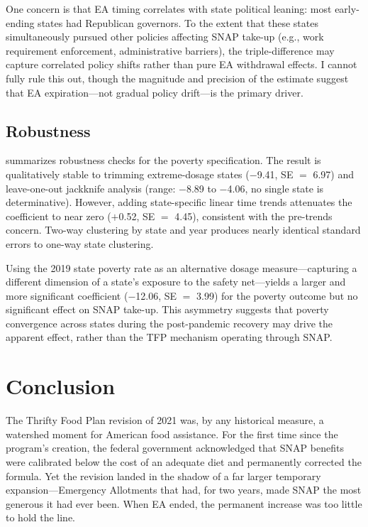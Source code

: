 \documentclass[12pt]{article}
\begin{document}
One concern is that EA timing correlates with state political leaning: most early-ending states had Republican governors. To the extent that these states simultaneously pursued other policies affecting SNAP take-up (e.g., work requirement enforcement, administrative barriers), the triple-difference may capture correlated policy shifts rather than pure EA withdrawal effects. I cannot fully rule this out, though the magnitude and precision of the estimate suggest that EA expiration---not gradual policy drift---is the primary driver.

\subsection{Robustness}

 summarizes robustness checks for the poverty specification. The result is qualitatively stable to trimming extreme-dosage states ($-$9.41, SE $=$ 6.97) and leave-one-out jackknife analysis (range: $-$8.89 to $-$4.06, no single state is determinative). However, adding state-specific linear time trends attenuates the coefficient to near zero ($+$0.52, SE $=$ 4.45), consistent with the pre-trends concern. Two-way clustering by state and year produces nearly identical standard errors to one-way state clustering.

Using the 2019 state poverty rate as an alternative dosage measure---capturing a different dimension of a state's exposure to the safety net---yields a larger and more significant coefficient ($-$12.06, SE $=$ 3.99) for the poverty outcome but no significant effect on SNAP take-up. This asymmetry suggests that poverty convergence across states during the post-pandemic recovery may drive the apparent effect, rather than the TFP mechanism operating through SNAP.



\section{Conclusion}
\label{sec:conclusion}

The Thrifty Food Plan revision of 2021 was, by any historical measure, a watershed moment for American food assistance. For the first time since the program's creation, the federal government acknowledged that SNAP benefits were calibrated below the cost of an adequate diet and permanently corrected the formula. Yet the revision landed in the shadow of a far larger temporary expansion---Emergency Allotments that had, for two years, made SNAP the most generous it had ever been. When EA ended, the permanent increase was too little to hold the line.
\end{document}
